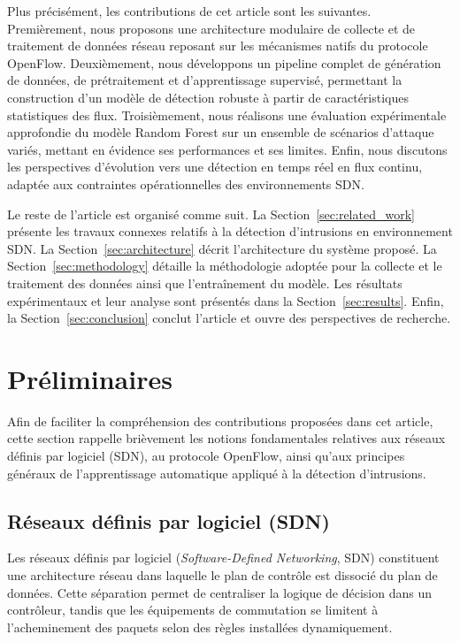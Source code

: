 \documentclass[11pt]{article}
\begin{document}
Plus précisément, les contributions de cet article sont les suivantes. Premièrement, nous proposons une architecture modulaire de collecte et de traitement de données réseau reposant sur les mécanismes natifs du protocole OpenFlow. Deuxièmement, nous développons un pipeline complet de génération de données, de prétraitement et d’apprentissage supervisé, permettant la construction d’un modèle de détection robuste à partir de caractéristiques statistiques des flux. Troisièmement, nous réalisons une évaluation expérimentale approfondie du modèle Random Forest sur un ensemble de scénarios d’attaque variés, mettant en évidence ses performances et ses limites. Enfin, nous discutons les perspectives d’évolution vers une détection en temps réel en flux continu, adaptée aux contraintes opérationnelles des environnements SDN.

Le reste de l’article est organisé comme suit. La Section~\ref{sec:related_work} présente les travaux connexes relatifs à la détection d’intrusions en environnement SDN. La Section~\ref{sec:architecture} décrit l’architecture du système proposé. La Section~\ref{sec:methodology} détaille la méthodologie adoptée pour la collecte et le traitement des données ainsi que l’entraînement du modèle. Les résultats expérimentaux et leur analyse sont présentés dans la Section~\ref{sec:results}. Enfin, la Section~\ref{sec:conclusion} conclut l’article et ouvre des perspectives de recherche.
\section{Préliminaires}

Afin de faciliter la compréhension des contributions proposées dans cet article, cette section rappelle brièvement les notions fondamentales relatives aux réseaux définis par logiciel (SDN), au protocole OpenFlow, ainsi qu’aux principes généraux de l’apprentissage automatique appliqué à la détection d’intrusions.

\subsection{Réseaux définis par logiciel (SDN)}

Les réseaux définis par logiciel (\textit{Software-Defined Networking}, SDN) constituent une architecture réseau dans laquelle le plan de contrôle est dissocié du plan de données. Cette séparation permet de centraliser la logique de décision dans un contrôleur, tandis que les équipements de commutation se limitent à l’acheminement des paquets selon des règles installées dynamiquement.
\end{document}
